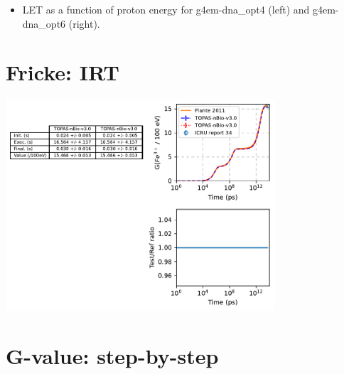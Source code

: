 \documentclass[aspectratio=1610]{beamer}
\begin{document}
\begin{frame}{\secname}
\begin{columns}
\begin{column}{0.4\linewidth}
    \end{column}
   \end{columns}
\begin{itemize}
\item \tiny{LET as a function of proton energy for g4em-dna\_opt4 (left) and g4em-dna\_opt6 (right).}
\end{itemize}
\end{frame}

\section{Fricke: IRT}

\begin{frame}{\secname}
 \centering
  \includegraphics[width=0.75\textwidth]{./FrickeIRT/Gvalue}
\end{frame}

\section{G-value: step-by-step}
\end{document}
